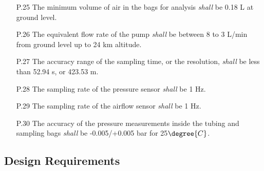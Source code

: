 \documentclass[a4paper,12pt,oneside]{article}
\begin{document}
\begin{appendices}
\begin{enumerate}
    \item[P.25] The minimum volume of air in the bags for analysis \textit{shall} be 0.18 L at ground level.
    \item[P.26] The equivalent flow rate of the pump \textit{shall} be between 8 to 3 L/min from ground level up to 24 km altitude.
    \item[P.27] The accuracy range of the sampling time, or the resolution, \textit{shall} be less than 52.94 s, or 423.53 m.
    \item[P.28] The sampling rate of the pressure sensor \textit{shall} be 1 Hz.
    \item[P.29] The sampling rate of the airflow sensor \textit{shall} be 1 Hz. 
    \item[P.30] The accuracy of the pressure measurements inside the tubing and sampling bags \textit{shall} be -0.005/+0.005 bar for 25$\degree{C}$.
 \end{enumerate} 

\subsection{Design Requirements}


\end{appendices}
\end{document}

